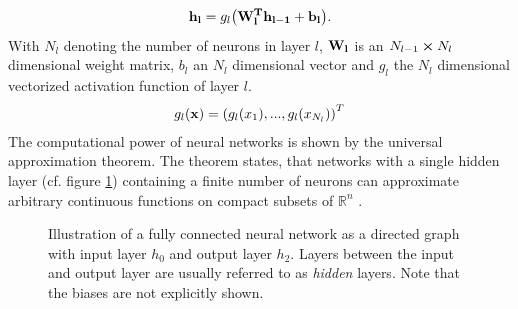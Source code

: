 \begin{align}
    \vb{h_l} = g_l\qty(\vb{W^T_l\vb{h_{l-1}}}+\vb{b_l}).
\end{align}
With $N_l$ denoting the number of neurons in layer $l$, $\vb{W_l}$ is an $N_{l-1}\cp N_l$ dimensional weight matrix, $b_l$ an $N_l$ dimensional vector and $g_l$ the $N_l$ dimensional vectorized activation function of layer $l$.
\begin{align}
    g_l(\vb{x}) = \qty(g_l(x_1),...,g_l(x_{N_l}))^T
\end{align}
The computational power of neural networks is shown by the universal approximation theorem. The theorem states, that networks with a single hidden layer (cf. figure \ref{fig:fully-connected}) containing a finite number of neurons can approximate arbitrary continuous functions on compact subsets of $\mathbb{R}^n$ \cite{univ-approx-1,univ-approx-2}.
\begin{figure}
    \centering
{}
\caption[Illustration of fully connected layers]{Illustration of a fully connected neural network as a directed graph with input layer $h_0$ and output layer $h_2$. Layers between the input and output layer are usually referred to as \emph{hidden} layers. Note that the biases are not explicitly shown.}\label{fig:fully-connected}
\end{figure}\noindent
